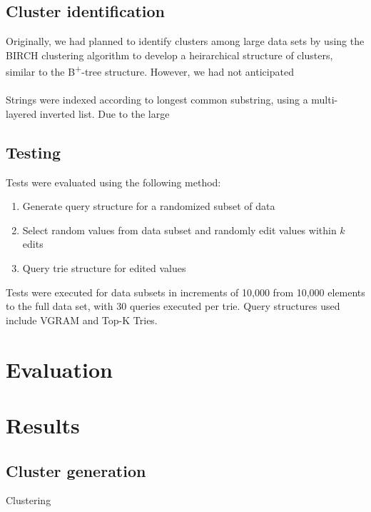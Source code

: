 \documentclass[pdftex,12pt,letter]{article}
\begin{document}
\subsection{Cluster identification}
Originally, we had planned to identify clusters among large data sets by using the BIRCH clustering algorithm to develop a heirarchical structure of clusters, similar to the B\textsuperscript{+}-tree structure. However, we had not anticipated 
\\
\\
Strings were indexed according to longest common substring, using a multi-layered inverted list. Due to the large 

\subsection{Testing}
Tests were evaluated using the following method:

\begin{enumerate}
\item Generate query structure for a randomized subset of data
\item Select random values from data subset and randomly edit values within $k$ edits
\item Query trie structure for edited values
\end{enumerate}

Tests were executed for data subsets in increments of 10,000 from 10,000 elements to the full data set, with 30 queries executed per trie. Query structures used include VGRAM and Top-K Tries.

\section{Evaluation}


\section{Results}
\subsection{Cluster generation}
Clustering
\end{document}
